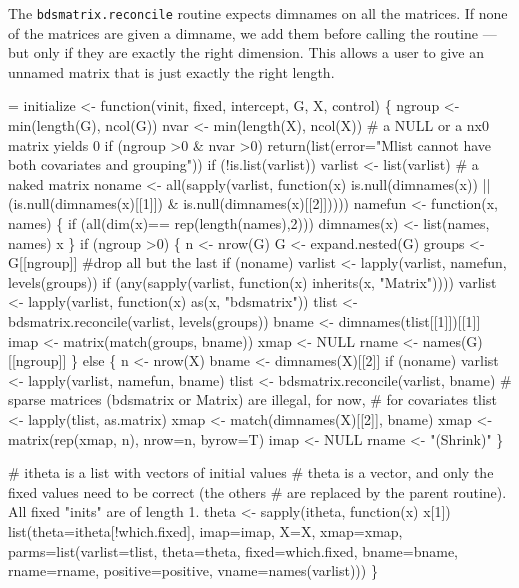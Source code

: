 \documentclass{article}
\begin{document}
The \Verb!bdsmatrix.reconcile! routine expects dimnames on all the
matrices.  If none of the matrices are given a dimname, we add
them before calling the routine --- but only if they are exactly
the right dimension.  This allows a user to give an unnamed matrix
that is just exactly the right length.
\begin{nwchunk}
=
 initialize <- function(vinit, fixed, intercept, G, X, control) \{
     ngroup <- min(length(G), ncol(G))
     nvar   <- min(length(X), ncol(X))  # a NULL or a nx0 matrix yields 0
     if (ngroup >0 & nvar >0)
         return(list(error="Mlist cannot have both covariates and grouping"))
     if (!is.list(varlist)) varlist <- list(varlist)  # a naked matrix
     noname <- all(sapply(varlist, function(x) is.null(dimnames(x)) || 
                       (is.null(dimnames(x)[[1]]) & is.null(dimnames(x)[[2]]))))
     namefun <- function(x, names) \{
         if (all(dim(x)== rep(length(names),2))) 
             dimnames(x) <- list(names, names)
         x
         \}
     if (ngroup >0) \{
         n <- nrow(G)
         G <- expand.nested(G)
         groups <- G[[ngroup]]  #drop all but the last
         if (noname) varlist <- lapply(varlist, namefun, levels(groups))
         if (any(sapply(varlist, function(x) inherits(x, "Matrix"))))
             varlist <- lapply(varlist, function(x) as(x, "bdsmatrix"))
         tlist <- bdsmatrix.reconcile(varlist, levels(groups))
         bname <-  dimnames(tlist[[1]])[[1]]
         imap <- matrix(match(groups, bname))
         xmap <- NULL
         rname <- names(G)[[ngroup]]
         \}
     else \{
         n <- nrow(X)
         bname <- dimnames(X)[[2]]
         if (noname) varlist <- lapply(varlist, namefun, bname)
         tlist <- bdsmatrix.reconcile(varlist, bname)
         # sparse matrices (bdsmatrix or Matrix) are illegal, for now, 
         #   for covariates
         tlist <- lapply(tlist, as.matrix)
         xmap <- match(dimnames(X)[[2]], bname)
         xmap <- matrix(rep(xmap, n), nrow=n, byrow=T)
         imap <- NULL
         rname <- "(Shrink)"
         \}
 
 
     # itheta is a list with vectors of initial values
     # theta is a vector, and only the fixed values need to be correct (the others
     #  are replaced by the parent routine).  All fixed "inits" are of length 1.
     theta <- sapply(itheta, function(x) x[1])    
     list(theta=itheta[!which.fixed], imap=imap, X=X, xmap=xmap,
          parms=list(varlist=tlist, theta=theta, fixed=which.fixed,
                     bname=bname, rname=rname, positive=positive,
                     vname=names(varlist)))
     \}
\end{nwchunk}
\end{document}
